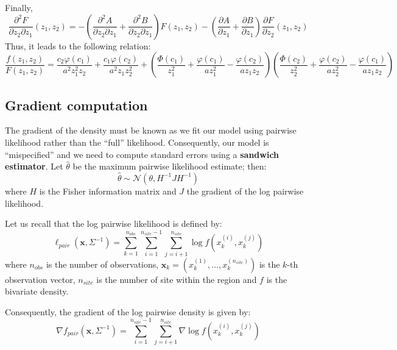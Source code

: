 \documentclass{article}
\begin{document}
Finally,
\begin{equation}
  \label{eq:9}
  \frac{\partial^2 F}{\partial z_2 \partial z_1} (z_1,
  z_2) = - \left(\frac{\partial^2 A}{\partial z_2 \partial z_1} +
    \frac{\partial^2 B}{\partial z_2 \partial z_1} \right) F(z_1, z_2)
  - \left(\frac{\partial A}{\partial z_1} + \frac{\partial B}{\partial
      z_1} \right) \frac{\partial F}{\partial z_2} (z_1, z_2)
\end{equation}
Thus, it leads to the following relation:
\begin{equation}
  \label{eq:11}
  \frac{f(z_1, z_2)}{F(z_1, z_2)} = \frac{c_2 \varphi(c_1)}{a^2z_1^2z_2} + \frac{c_1
    \varphi(c_2)}{a^2z_1z_2^2} + \left(\frac{\Phi(c_1)}{z_1^2} +
    \frac{\varphi(c_1)}{az_1^2} - \frac{\varphi(c_2)}{az_1z_2} \right)
  \left(\frac{\Phi(c_2)}{z_2^2} + \frac{\varphi(c_2)}{az_2^2} -
    \frac{\varphi(c_1)}{az_1z_2} \right)
\end{equation}

\subsection{Gradient computation}
\label{sec:gradient-computation}

The gradient of the density must be known as we fit our model using
pairwise likelihood rather than the ``full'' likelihood. Consequently,
our model is ``mispecified'' and we need to compute standard errors
using a \textbf{sandwich estimator}. Let $\hat{\theta}$ be the maximum
pairwise likelihood estimate; then:
\begin{equation*}
  \hat{\theta} \sim \mathcal{N}\left(\theta, H^{-1} J H^{-1}\right)
\end{equation*}
where $H$ is the Fisher information matrix and $J$ the gradient of the
log pairwise likelihood.

Let us recall that the log pairwise likelihood is defined by:
\begin{equation*}
  \ell_{pair}(\mathbf{x}, \Sigma^{-1}) = \sum_{k = 1}^{n_{obs}}
  \sum_{i=1}^{n_{site}-1} \sum_{j=i+1}^{n_{site}} \log f(x_k^{(i)}, x_k^{(j)})
\end{equation*}
where $n_{obs}$ is the number of observations, $\mathbf{x}_k =
(x_k^{(1)}, \ldots, x_k^{(n_{site})})$ is the $k$-th observation vector,
$n_{site}$ is the number of site within the region and $f$ is the
bivariate density.

Consequently, the gradient of the log pairwise density is given by:
\begin{equation*}
  \nabla f_{pair}(\mathbf{x}, \Sigma^{-1}) = \sum_{i=1}^{n_{site}-1}
  \sum_{j=i+1}^{n_{site}} \nabla \log f(x_k^{(i)}, x_k^{(j)})
\end{equation*}
\end{document}
